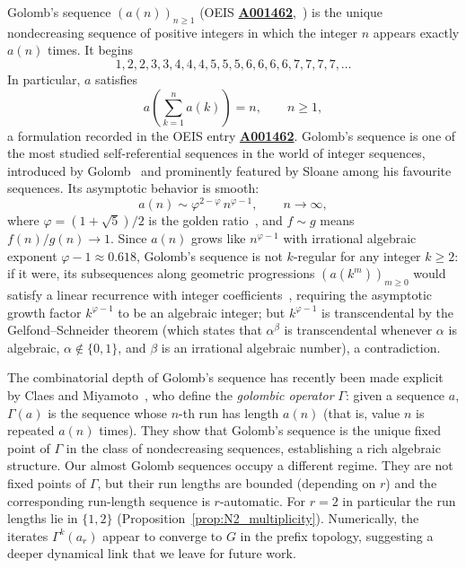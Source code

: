\documentclass[12pt]{article}
\theoremstyle{definition}
\theoremstyle{remark}
\newcommand{\oeis}[1]{\href{https://oeis.org/#1}{\textbf{#1}}}
\begin{document}
Golomb's sequence $(a(n))_{n\ge 1}$ (OEIS \oeis{A001462},~\cite{OEIS}) is the unique nondecreasing
sequence of positive integers in which the integer $n$ appears exactly $a(n)$ times.
It begins
\[
  1, 2, 2, 3, 3, 4, 4, 4, 5, 5, 5, 6, 6, 6, 6, 7, 7, 7, 7, \ldots
\]
In particular, $a$ satisfies
\begin{equation}\label{eq:golomb}
  a\!\left(\sum_{k=1}^{n} a(k)\right) = n, \qquad n\ge 1,
\end{equation}
a formulation recorded in the OEIS entry \oeis{A001462}.
Golomb's sequence is one of the most studied self-referential sequences in the
world of integer sequences, introduced by Golomb~\cite{Golomb66} and prominently
featured by Sloane among his favourite sequences.
Its asymptotic behavior is smooth:
\begin{equation}\label{eq:golomb-asymp}
  a(n) \sim \varphi^{2-\varphi}\, n^{\varphi-1}, \qquad n\to\infty,
\end{equation}
where $\varphi=(1+\sqrt{5})/2$ is the golden ratio~\cite{petermann95},
and $f\sim g$ means $f(n)/g(n)\to 1$.
Since $a(n)$ grows like $n^{\varphi-1}$ with irrational algebraic exponent
$\varphi-1\approx 0.618$, Golomb's sequence is not $k$-regular for any integer
$k\ge 2$: if it were, its subsequences along geometric progressions
$(a(k^m))_{m\ge 0}$ would satisfy a linear recurrence with integer
coefficients~\cite[Theorem~2.2]{AS92}, requiring the asymptotic growth factor
$k^{\varphi-1}$ to be an algebraic integer; but $k^{\varphi-1}$ is
transcendental by the Gelfond--Schneider theorem (which states that $\alpha^\beta$
is transcendental whenever $\alpha$ is algebraic, $\alpha\notin\{0,1\}$, and $\beta$
is an irrational algebraic number), a contradiction.

The combinatorial depth of Golomb's sequence has recently been made explicit by
Claes and Miyamoto~\cite{CM26}, who define the \emph{golombic operator}
$\Gamma$: given a sequence $a$, $\Gamma(a)$ is the sequence whose $n$-th
run has length $a(n)$ (that is, value $n$ is repeated $a(n)$ times).
They show that Golomb's sequence is the unique fixed point of $\Gamma$
in the class of nondecreasing sequences, establishing a rich algebraic
structure. Our almost Golomb sequences occupy a different regime. They are not fixed
points of $\Gamma$, but their run lengths are bounded (depending on $r$) and the
corresponding run-length sequence is $r$-automatic. For $r=2$ in particular the
run lengths lie in $\{1,2\}$ (Proposition~\ref{prop:N2_multiplicity}).
Numerically, the iterates $\Gamma^k(a_r)$ appear to converge to $G$ in the
prefix topology, suggesting a deeper dynamical link that we leave for future work.
\end{document}
